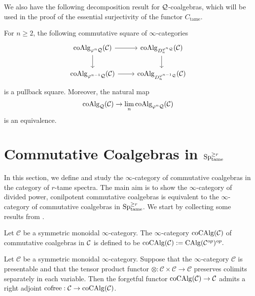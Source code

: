 We also have the following decomposition result for ${\mathcal{Q}}$-coalgebras, which will be used in the proof of the essential surjectivity of the functor $C_{\operatorname{tame}}$.
\begin{proposition}
\cite[Theorem 4.12]{Heuts_Koszul}
\label{inductive construction of coalgebras}
    For $n\geq 2$, the following commutative square of $\infty$-categories 
\[
\begin{tikzcd}
	\coAlg_{\varphi^n \CQ}(\CC) & 
	\coAlg_{D_n^{\varphi^{n}\CQ}}(\CC)\\
	\coAlg_{\varphi^{n-1} \CQ}(\CC) & 
	\coAlg_{D_n^{\varphi^{n-1}\CQ}}(\CC)
	\arrow[from=1-1, to= 1-2]
	\arrow[from=1-1, to=2-1]
	\arrow[from=1-2, to=2-2]
	\arrow[from=2-1, to= 2-2]
\end{tikzcd}
\]
is a pullback square. Moreover, the natural map
$$
\operatorname{coAlg}_{{\mathcal{Q}}}({\mathcal{C}}) \to \lim_n \operatorname{coAlg}_{\varphi^n{\mathcal{Q}}}({\mathcal{C}})
$$
is an equivalence.
\end{proposition}

\section{Commutative Coalgebras in $\operatorname{Sp}^{\geq r}_{\operatorname{\operatorname{tame}}}$}
\label{Commutative coalgebras in tame spectra}

In this section, we define and study the $\infty$-category of commutative coalgebras in the category of $r$-tame spectra. 
The main aim is to show the $\infty$-category of divided power, conilpotent commutative coalgebras is equivalent to the $\infty$-category of commutative coalgebras in $\operatorname{Sp}^{\geq r}_{\operatorname{\operatorname{tame}}}$.
We start by collecting some results from \cite{LurieEllipticI}.

\begin{definition}
    Let $\mathcal{C}$ be a symmetric monoidal $\infty$-category. The $\infty$-category $\operatorname{coCAlg}({\mathcal{C}})$ of commutative coalgebras in ${\mathcal{C}}$ is defined to be
    $
    \operatorname{coCAlg}({\mathcal{C}}):= \operatorname{CAlg}({\mathcal{C}}^{op})^{op}.
    $
\end{definition}


\begin{proposition}
\label{Cor 3.1.5. Ellip}
\cite[Corollary 3.1.5]{LurieEllipticI}
	Let $\mathcal{C}$ be a symmetric monoidal $\infty$-category. Suppose that the $\infty$-category $\mathcal{C}$ is presentable and that the tensor product functor $\otimes: \mathcal{C} \times \mathcal{C} \rightarrow \mathcal{C}$ preserves colimits separately in each variable. Then the forgetful functor $\operatorname{coCAlg}(\mathcal{C}) \rightarrow \mathcal{C}$ admits a right adjoint $\operatorname{cofree}: \mathcal{C} \rightarrow \operatorname{coCAlg}(\mathcal{C})$.
\end{proposition}


